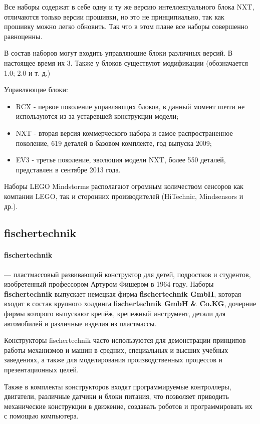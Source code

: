 Все наборы содержат в себе одну и ту же версию интеллектуального блока NXT, отличаются только версии прошивки, но это не принципиально, так как прошивку можно легко обновить. Так что в этом плане все наборы совершенно равноценны. 

В состав наборов могут входить управляющие блоки различных версий. В настоящее время их 3. Также у блоков существуют модификации (обозначается 1.0; 2.0 и т. д.)

Управляющие блоки:
\begin{itemize}
\item RCX - первое поколение управляющих блоков, в данный момент почти не используются из-за устаревшей конструкции модели;
\item NXT - вторая версия коммерческого набора и самое распространенное поколение, 619 деталей в базовом комплекте, год выпуска 2009;
\item EV3 - третье поколение, эволюция модели NXT, более 550 деталей, представлен в сентябре 2013 года.
\end{itemize}
Наборы LEGO Mindstorms располагают огромным количеством сенсоров как компании LEGO, так и сторонних производителей (HiTechnic, Mindsensors и др.). 

\subsection{fischertechnik}

\paragraph{fischertechnik} — пластмассовый развивающий конструктор для детей, подростков и студентов, изобретенный профессором Артуром Фишером в 1964 году. Наборы \textbf{fischertechnik} выпускает немецкая фирма \textbf{fischertechnik GmbH}, которая входит в состав крупного холдинга \textbf{fischertechnik GmbH \& Co.KG}, дочерние фирмы которого выпускают крепёж, крепежный инструмент, детали для автомобилей и различные изделия из пластмассы.

Конструкторы fischertechnik часто используются для демонстрации принципов работы механизмов и машин в средних, специальных и высших учебных заведениях, а также для моделирования производственных процессов и презентационных целей.

Также в комплекты конструкторов входят программируемые контроллеры, двигатели, различные датчики и блоки питания, что позволяет приводить механические конструкции в движение, создавать роботов и программировать их с помощью компьютера.

